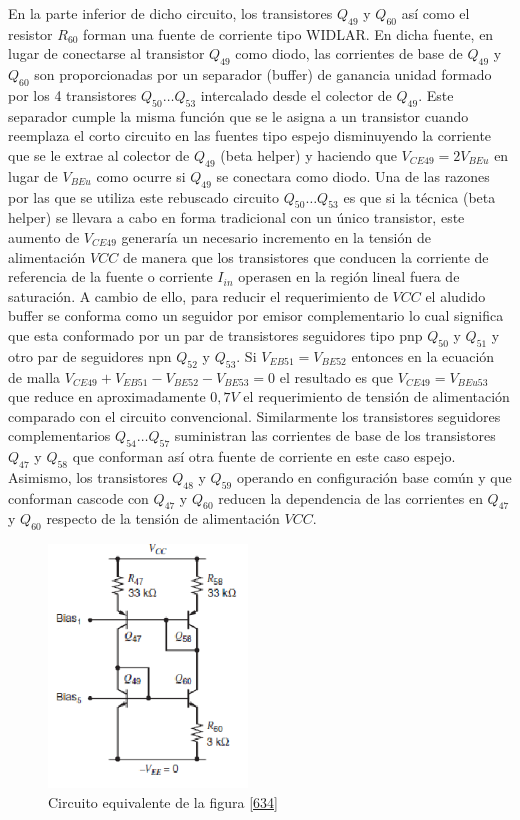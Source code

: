 \documentclass[12pt,a4paper,final,headinclude,footinclude,BCOR5mm]{scrartcl}
\begin{document}
En la parte inferior de dicho circuito, los transistores $Q_{49}$ y $Q_{60}$ así como el resistor $R_{60}$ forman una fuente de corriente tipo WIDLAR. En dicha fuente, en lugar de conectarse al transistor $Q_{49}$ como diodo, las corrientes de base de $Q_{49}$ y $Q_{60}$ son proporcionadas por un separador (buffer) de ganancia unidad formado por los 4 transistores $Q_{50} \ldots Q_{53}$ intercalado desde el colector de $Q_{49}$. Este separador cumple la misma función que se le asigna a un transistor cuando reemplaza el corto circuito en las fuentes tipo espejo disminuyendo la corriente que se le extrae al colector de $Q_{49}$ (beta helper) y haciendo que $V_{CE49} = 2 V_{BEu}$ en lugar de $V_{BEu}$ como ocurre si $Q_{49}$ se conectara como diodo. Una de las razones por las que se utiliza este rebuscado circuito $Q_{50} \ldots Q_{53}$ es que si la técnica (beta helper) se llevara a cabo en forma tradicional con un único transistor, este aumento de $V_{CE49}$ generaría un necesario incremento en la tensión de alimentación $VCC$ de manera que los transistores que conducen la corriente de referencia de la fuente o corriente $I_{in}$ operasen en la región lineal fuera de saturación. A cambio de ello, para reducir el requerimiento de $VCC$ el aludido buffer  se conforma como un seguidor por emisor complementario lo cual significa que esta conformado por un par de transistores seguidores tipo pnp $Q_{50}$ y $Q_{51}$ y otro par de seguidores npn $Q_{52}$ y $Q_{53}$.  Si $V_{EB51} = V_{BE52}$ entonces en la ecuación de malla $V_{CE49} + V_{EB51} - V_{BE52} - V_{BE53} = 0$ el resultado es que $V_{CE49} = V_{BEu53}$ que reduce en aproximadamente $0,7 V$ el requerimiento de tensión de alimentación comparado con el circuito convencional. Similarmente los transistores seguidores complementarios $Q_{54} \ldots Q_{57}$ suministran las corrientes de base de los transistores $Q_{47}$ y $Q_{58}$ que conforman así otra fuente de corriente en este caso espejo. Asimismo, los transistores $Q_{48}$ y $Q_{59}$ operando en configuración base común y que conforman cascode con $Q_{47}$ y $Q_{60}$ reducen la dependencia de las corrientes en $Q_{47}$ y $Q_{60}$ respecto de la tensión de alimentación $VCC$.\\ 

\begin{figure}
\begin{center}
\includegraphics[width=150pt]{./imagenes/equiv.png}
\end{center}
\caption{Circuito equivalente de la figura \ref{634}}
\label{635}
\end{figure}
\end{document}
